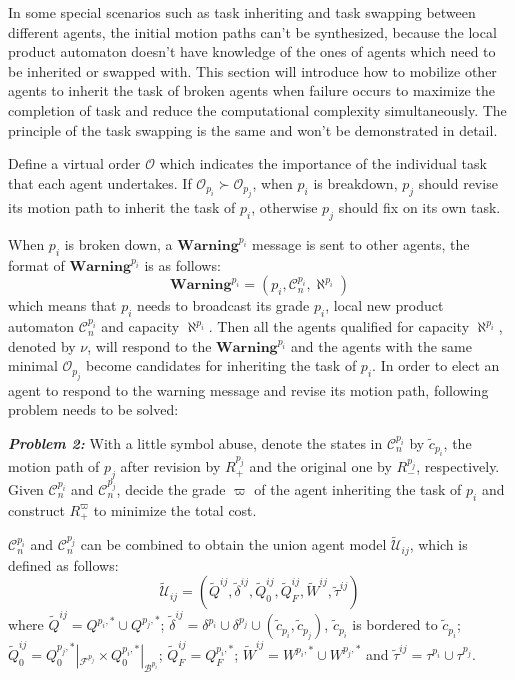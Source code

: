 \documentclass[journal]{IEEEtran}
\begin{document}
In some special scenarios such as task inheriting and task swapping between different agents, the initial motion paths can't be synthesized, because the local product automaton doesn't have knowledge of the ones of agents which need to be inherited or swapped with. This section will introduce how to mobilize other agents to inherit the task of broken agents when failure occurs to maximize the completion of task and reduce the computational complexity simultaneously. The principle of the task swapping is the same and won't be demonstrated in detail.

Define a virtual order $\mathcal{O}$ which indicates the importance of the individual task that each agent undertakes. If $\mathcal{O}_{p_i}\succ \mathcal{O}_{p_j}$, when $p_i$ is breakdown, $p_j$ should revise its motion path to inherit the task of $p_i$, otherwise $p_j$ should fix on its own task.\par
When $p_i$ is broken down, a $\textbf{Warning}^{p_i}$ message is sent to other agents, the format of $\textbf{Warning}^{p_i}$ is as follows:
$$\textbf{Warning}^{p_i} = (p_i,\mathcal{C}^{p_i}_n,\aleph^{p_i})$$
which means that $p_i$ needs to broadcast its grade $p_i$, local new product automaton $\mathcal{C}^{p_i}_n$ and capacity $\aleph^{p_i}$. Then all the agents qualified for capacity $\aleph^{p_i}$, denoted by $\nu$, will respond to the $\textbf{Warning}^{p_i}$ and the agents with the same minimal $\mathcal{O}_{p_j}$ become candidates for inheriting the task of $p_i$. In order to elect an agent to respond to the warning message and revise its motion path, following problem needs to be solved:\par
\textbf{\emph{Problem 2:}} With a little symbol abuse, denote the states in $\mathcal{C}^{p_i}_n$ by $\tilde{c}_{p_i}$, the motion path of $p_j$ after revision by $R^{p_j}_+$ and the original one by $R^{p_j}_-$, respectively. Given $\mathcal{C}^{p_i}_n$ and $\mathcal{C}^{p_j}_n$, decide the grade $\varpi$ of the agent inheriting the task of $p_i$ and construct $R^{\varpi}_+$ to minimize the total cost. \par
$\mathcal{C}^{p_i}_n$ and $\mathcal{C}^{p_j}_n$ can be combined to obtain the union agent model $\widetilde{\mathcal{U}}_{ij}$, which is defined as follows:
$$\widetilde{\mathcal{U}}_{ij}=(\widetilde{Q}^{ij},\tilde{\delta}^{ij},\widetilde{Q}^{ij}_0,\widetilde{Q}^{ij}_F,\widetilde{W}^{ij},\tilde{\tau}^{ij})$$
where $\widetilde{Q}^{ij}=Q^{p_i,\ast}\cup Q^{p_j,\ast}$; $\tilde{\delta}^{ij}=\delta^{p_i}\cup \delta^{p_j} \cup (\tilde{c}_{p_i},\tilde{c}_{p_j})$, $\tilde{c}_{p_i}$ is bordered to $\tilde{c}_{p_i}$; $\widetilde{Q}^{ij}_0=Q^{p_j,\ast}_0|_{\mathcal{F}^{p_j}}\times Q^{p_i,\ast}_0|_{\mathcal{B}^{p_i}} $; $\widetilde{Q}^{ij}_F=Q^{p_i,\ast}_F$; $\widetilde{W}^{ij}=W^{p_i,\ast}\cup W^{p_j,\ast}$ and $\tilde{\tau}^{ij}=\tau^{p_i}\cup \tau^{p_j}$.\par
\end{document}
